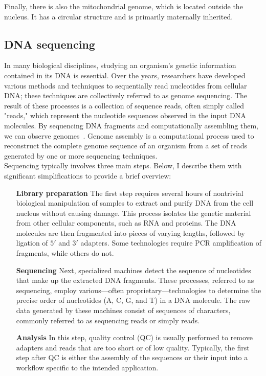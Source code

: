 Finally, there is also the mitochondrial genome, which is located outside the nucleus. It has a circular structure and is primarily maternally inherited.

\subsection{DNA sequencing}
In many biological disciplines, studying an organism's genetic information contained in its DNA is essential. Over the years, researchers have developed various methods and techniques to sequentially read nucleotides from cellular DNA; these techniques are collectively referred to as genome sequencing. The result of these processes is a collection of sequence reads, often simply called "reads," which represent the nucleotide sequences observed in the input DNA molecules. By sequencing DNA fragments and computationally assembling them, we can observe genomes~\cite{garrison_pangenome}. Genome assembly is a computational process used to reconstruct the complete genome sequence of an organism from a set of reads generated by one or more sequencing techniques.\\
Sequencing typically involves three main steps. Below, I describe them with significant simplifications to provide a brief overview:
\begin{itemize}[leftmargin=1.8cm]
	\item[\textbf{Library preparation}] The first step requires several hours of nontrivial biological manipulation of samples to extract and purify DNA from the cell nucleus without causing damage. This process isolates the genetic material from other cellular components, such as RNA and proteins. The DNA molecules are then fragmented into pieces of varying lengths, followed by ligation of $5\prime$ and $3\prime$ adapters. Some technologies require \gls{PCR} amplification of fragments, while others do not.
	\item[\textbf{Sequencing}]Next, specialized machines detect the sequence of nucleotides that make up the extracted DNA fragments. These processes, referred to as sequencing, employ various—often proprietary—technologies to determine the precise order of nucleotides (A, C, G, and T) in a DNA molecule. The raw data generated by these machines consist of sequences of characters, commonly referred to as sequencing reads or simply reads.
	\item[\textbf{Analysis}] In this step, quality control (\gls{QC}) is usually performed to remove adapters and reads that are too short or of low quality. Typically, the first step after QC is either the assembly of the sequences or their input into a workflow specific to the intended application.
\end{itemize}
